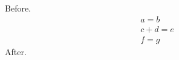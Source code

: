 \documentclass[10pt]{article}
\begin{document}
Before.
\begin{gather}
 a = b \tag{$\ast$}\\
 c + d = e \\
 f = g \tag*{(ii $n$)}
\end{gather}
After.
\end{document}
